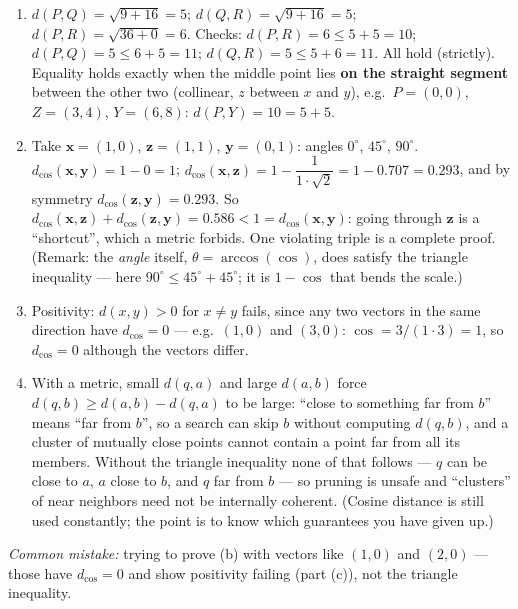 \documentclass[
  11pt,
]{article}
\begin{document}
\begin{solutionbox}

\begin{enumerate}
\def\labelenumi{(\alph{enumi})}
\item
  \(d(P,Q) = \sqrt{9+16} = 5\); \(d(Q,R) = \sqrt{9+16} = 5\);
  \(d(P,R) = \sqrt{36+0} = 6\). Checks: \(d(P,R) = 6 \le 5+5 = 10\);
  \(d(P,Q) = 5 \le 6+5 = 11\); \(d(Q,R) = 5 \le 5+6 = 11\). All hold
  (strictly). Equality holds exactly when the middle point lies
  \textbf{on the straight segment} between the other two (collinear,
  \(z\) between \(x\) and \(y\)), e.g.~\(P=(0,0)\), \(Z=(3,4)\),
  \(Y=(6,8)\): \(d(P,Y) = 10 = 5 + 5\).
\item
  Take \(\mathbf{x} = (1,0)\), \(\mathbf{z} = (1,1)\),
  \(\mathbf{y} = (0,1)\): angles \(0^\circ\), \(45^\circ\),
  \(90^\circ\). \(d_{\cos}(\mathbf{x},\mathbf{y}) = 1 - 0 = 1\);
  \(d_{\cos}(\mathbf{x},\mathbf{z}) = 1 - \dfrac{1}{1\cdot\sqrt2} = 1 - 0.707 = 0.293\),
  and by symmetry \(d_{\cos}(\mathbf{z},\mathbf{y}) = 0.293\). So
  \(d_{\cos}(\mathbf{x},\mathbf{z}) + d_{\cos}(\mathbf{z},\mathbf{y}) = 0.586 < 1 = d_{\cos}(\mathbf{x},\mathbf{y})\):
  going through \(\mathbf{z}\) is a ``shortcut'', which a metric
  forbids. One violating triple is a complete proof. (Remark: the
  \emph{angle} itself, \(\theta = \arccos(\cos)\), does satisfy the
  triangle inequality --- here \(90^\circ \le 45^\circ + 45^\circ\); it
  is \(1-\cos\) that bends the scale.)
\item
  Positivity: \(d(x,y)>0\) for \(x\ne y\) fails, since any two vectors
  in the same direction have \(d_{\cos} = 0\) --- e.g.~\((1,0)\) and
  \((3,0)\): \(\cos = 3/(1\cdot3) = 1\), so \(d_{\cos} = 0\) although
  the vectors differ.
\item
  With a metric, small \(d(q,a)\) and large \(d(a,b)\) force
  \(d(q,b) \ge d(a,b) - d(q,a)\) to be large: ``close to something far
  from \(b\)'' means ``far from \(b\)'', so a search can skip \(b\)
  without computing \(d(q,b)\), and a cluster of mutually close points
  cannot contain a point far from all its members. Without the triangle
  inequality none of that follows --- \(q\) can be close to \(a\), \(a\)
  close to \(b\), and \(q\) far from \(b\) --- so pruning is unsafe and
  ``clusters'' of near neighbors need not be internally coherent.
  (Cosine distance is still used constantly; the point is to know which
  guarantees you have given up.)
\end{enumerate}

\emph{Common mistake:} trying to prove (b) with vectors like \((1,0)\)
and \((2,0)\) --- those have \(d_{\cos}=0\) and show positivity failing
(part (c)), not the triangle inequality.

\end{solutionbox}
\end{document}
